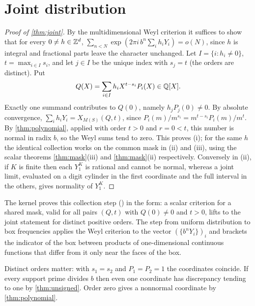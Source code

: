 \documentclass[11pt]{article}
\newcommand{\decl}[3]{\lean{#1}{#2}{\texttt{#3}}}
\begin{document}
\section{Joint distribution}\label{sec:jointproofs}
\begin{proof}[Proof of \cref{thm:joint}]
By the multidimensional Weyl criterion it suffices to show that for every $0\ne h\in\mathbb Z^d$, $\sum_{n<N}\exp(2\pi i\,b^n\sum_ih_iY_i)=o(N)$, since $h$ is integral and fractional parts leave the character unchanged. Let $I=\{i:h_i\ne0\}$, $t=\max_{i\in I}s_i$, and let $j\in I$ be the unique index with $s_j=t$ (the orders are distinct). Put
\[
 Q(X)=\sum_{i\in I}h_iX^{t-s_i}P_i(X)\in\mathbb Q[X].
\]
Exactly one summand contributes to $Q(0)$, namely $h_jP_j(0)\ne0$. By absolute convergence, $\sum_ih_iY_i=X_{M(S)}(Q,t)$, since $P_i(m)/m^{s_i}=m^{t-s_i}P_i(m)/m^t$. By \cref{thm:polynomial}, applied with order $t>0$ and $r=0<t$, this number is normal in radix $b$, so the Weyl sums tend to zero. This proves (i); for the same $h$ the identical collection works on the common mask in (ii) and (iii), using the scalar theorems \cref{thm:mask}(iii) and \cref{thm:mask}(ii) respectively. Conversely in (ii), if $K$ is finite then each $Y_1^K$ is rational and cannot be normal, whereas a joint limit, evaluated on a digit cylinder in the first coordinate and the full interval in the others, gives normality of $Y_1^K$.
\end{proof}
\noindent The kernel proves this collection step (\decl{LocalizedJoint}{72}{joint\_\allowbreak{}of\_\allowbreak{}masked\_\allowbreak{}poles}) in the form: a scalar criterion for a shared mask, valid for all pairs $(Q,t)$ with $Q(0)\ne0$ and $t>0$, lifts to the joint statement for distinct positive orders. The step from uniform distribution to box frequencies applies the Weyl criterion to the vector $(\{b^nY_i\})_i$ and brackets the indicator of the box between products of one-dimensional continuous functions that differ from it only near the faces of the box.

\begin{example}
Distinct orders matter: with $s_1=s_2$ and $P_1=P_2=1$ the coordinates coincide. If every support prime divides $b$ then even one coordinate has discrepancy tending to one by \cref{thm:unsigned}. Order zero gives a nonnormal coordinate by \cref{thm:polynomial}.
\end{example}
\end{document}
